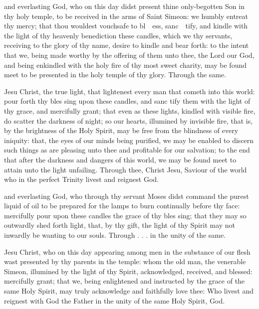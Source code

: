 {} and everlasting God, who on this day didst present thine only-begotten Son in thy holy temple, to be received in the arms of Saint Simeon: we humbly entreat thy mercy; that thou wouldest vouchsafe to bl~{}~ess, sanc~{}~tify, and kindle with the light of thy heavenly benediction these candles, which we thy servants, receiving to the glory of thy name, desire to kindle and bear forth: to the intent that we, being made worthy by the offering of them unto thee, the Lord our God, and being enkindled with the holy fire of thy most sweet charity, may be found meet to be presented in the holy temple of thy glory. Through the same.

{} Jesu Christ, the true light, that lightenest every man that cometh into this world: pour forth thy bles {} sing upon these candles, and sanc {} tify them with the light of thy grace, and mercifully grant; that even as these lights, kindled with visible fire, do scatter the darkness of night; so our hearts, illumined by invisible fire, that is, by the brightness of the Holy Spirit, may be free from the blindness of every iniquity: that, the eyes of our minds being purified, we may be enabled to discern such things as are pleasing unto thee and profitable for our salvation; to the end that after the darkness and dangers of this world, we may be found meet to attain unto the light unfailing. Through thee, Christ Jesu, Saviour of the world who in the perfect Trinity livest and reignest God.

{} and everlasting God, who through thy servant Moses didst command the purest liquid of oil to be prepared for the lamps to burn continually before thy face: mercifully pour upon these candles the grace of thy bles {} sing; that they may so outwardly shed forth light, that, by thy gift, the light of thy Spirit may not inwardly be wanting to our souls. Through . . . in the unity of the same.

{} Jesu Christ, who on this day appearing among men in the substance of our flesh wast presented by thy parents in the temple: whom the old man, the venerable Simeon, illumined by the light of thy Spirit, acknowledged, received, and blessed: mercifully grant; that we, being enlightened and instructed by the grace of the same Holy Spirit, may truly acknowledge and faithfully love thee: Who livest and reignest with God the Father in the unity of the same Holy Spirit, God.

